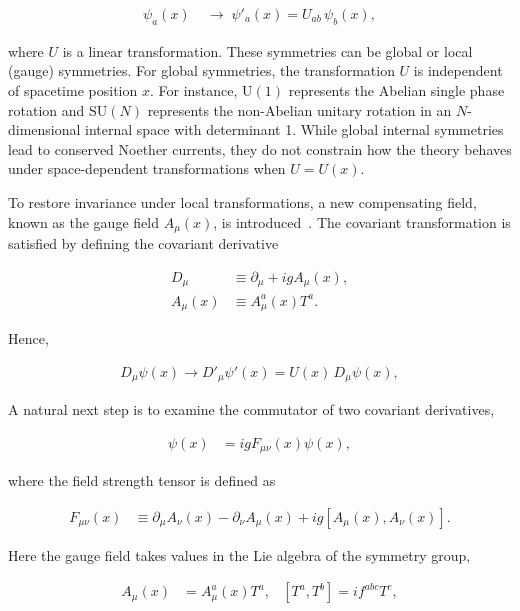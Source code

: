 \begin{align}
    \psi_a(x) &\;\rightarrow\; \psi'_a(x) = U_{ab}\, \psi_b(x),
\end{align}

where $U$ is a linear transformation. These symmetries can be global or local (gauge) symmetries.
For global symmetries, the transformation $U$ is independent of spacetime position $x$. For instance, $\mathrm{U}(1)$ represents the Abelian single phase rotation and $\mathrm{SU}(N)$ represents the non-Abelian unitary rotation in an $N$-dimensional internal space with determinant 1.
While global internal symmetries lead to conserved Noether currents, they do not constrain how the theory behaves under space-dependent transformations when $U=U(x)$.

To restore invariance under local transformations, a new compensating field, known as the gauge field $A_\mu(x)$, is introduced~\cite{YangMills1954}. The covariant transformation is satisfied by defining the covariant derivative

\begin{align}
    D_\mu &\equiv \partial_\mu + i g A_\mu(x),
\\
    A_\mu(x) &\equiv A_\mu^a(x) T^a.
\end{align}

Hence,

\begin{align}
    D_\mu \psi(x) \to D'_\mu \psi'(x) = U(x)\,D_\mu \psi(x),
\end{align}\label{interaction}

A natural next step is to examine the commutator of two covariant derivatives,

\begin{align}
    [D_\mu, D_\nu] \psi(x)
    &= igF_{\mu\nu}(x) \psi(x),
\end{align}

where the field strength tensor is defined as

\begin{align}
    F_{\mu\nu}(x)
    &\equiv \partial_\mu A_\nu(x) - \partial_\nu A_\mu(x)
      + ig [A_\mu(x), A_\nu(x)].
\end{align}

Here the gauge field takes values in the Lie algebra of the symmetry group,

\begin{align}
    A_\mu(x)
    &= A_\mu^a(x) T^a, &
    [T^a, T^b] = i f^{abc} T^c,
\end{align}

